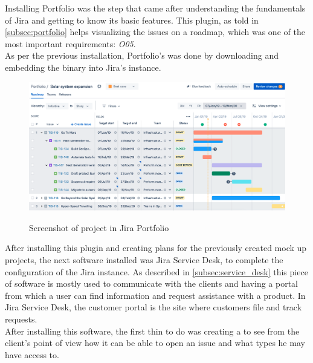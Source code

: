 	Installing Portfolio was the step that came after understanding the fundamentals of Jira and getting to know its basic features.
	This plugin, as told in \ref{subsec:portfolio} helps visualizing the issues on a roadmap, which was one of the most important requirements: \textit{O05}.\\
	As per the previous installation, Portfolio's was done by downloading and embedding the binary into Jira's instance.
	\begin{figure}[H]
		\centering
		\includegraphics[width=\textwidth]{resources/portfolio}\\
		\caption[Screenshot of project in Jira Portfolio]{Screenshot of project in Jira Portfolio\cite{portfolio}}
	\end{figure}
	After installing this plugin and creating plans for the previously created mock up projects, the next software installed was Jira Service Desk, to complete the configuration of the Jira instance.
	As described in \ref{subsec:service_desk} this piece of software is mostly used to communicate with the clients and having a portal from which a user can find information and request assistance with a product.
	In Jira Service Desk, the customer portal is the site where customers file and track requests.\\
	After installing this software, the first thin to do was creating a  to see from the client's point of view how it can be able to open an issue and what types he may have access to.
